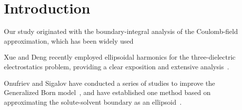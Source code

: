 \section{Introduction}

Our study originated with the boundary-integral analysis of the
Coulomb-field approximation, which has been widely used~\cite{Luo97}

Xue and Deng recently employed ellipsoidal harmonics for the
three-dielectric electrostatics problem, providing a clear exposition
and extensive analysis~\cite{Xue11}.

Onufriev and Sigalov have conducted a series of studies to improve the
Generalized Born model~\cite{Sigalov,Onufriev11}, and have established
one method based on approximating the solute-solvent boundary as an
ellipsoid~\cite{SigalovWhich}.


